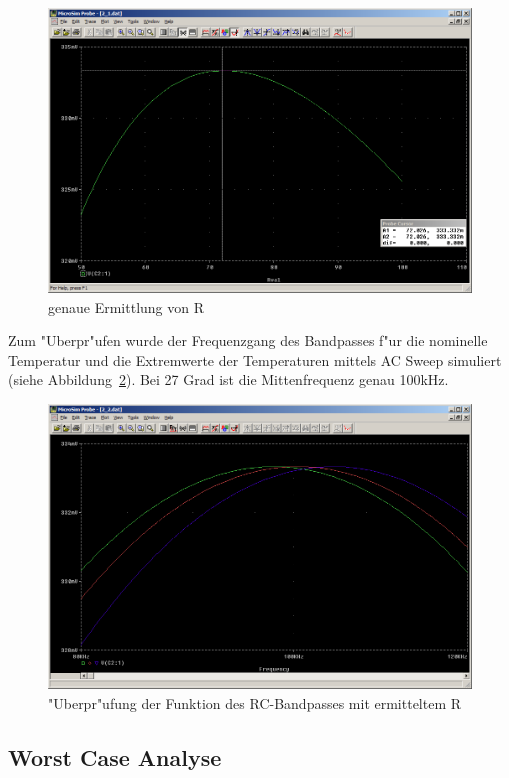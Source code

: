 \begin{figure}%
	\centering
	\includegraphics[width=\textwidth]{fig/bsp2/3_2_1_rdetail.PNG}
	\caption{genaue Ermittlung von R}
	\label{fig:3_2_1_rdetail}
\end{figure}

Zum "Uberpr"ufen wurde der Frequenzgang des Bandpasses f"ur die nominelle Temperatur und die Extremwerte der Temperaturen mittels AC Sweep simuliert (siehe Abbildung~\ref{fig:3_2_2_fT}). Bei 27 Grad ist die Mittenfrequenz genau 100kHz.

\begin{figure}%
	\centering
	\includegraphics[width=\textwidth]{fig/bsp2/3_2_2_fT.PNG}
	\caption{"Uberpr"ufung der Funktion des RC-Bandpasses mit ermitteltem R}
	\label{fig:3_2_2_fT}
\end{figure}


\subsection{Worst Case Analyse}

